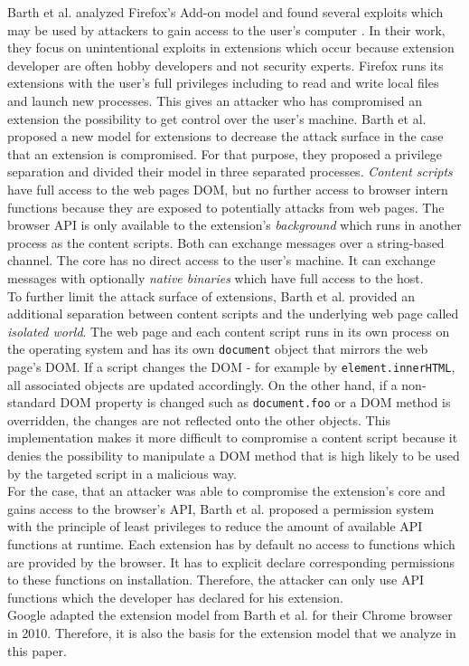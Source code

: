 	Barth et al. analyzed Firefox's Add-on model and found several exploits which may be used by attackers to gain access to the user's computer \cite{Barth10protectingbrowsers}. In their work, they focus on unintentional exploits in extensions which occur because extension developer are often hobby developers and not security experts. Firefox runs its extensions with the user's full privileges including to read and write local files and launch new processes. This gives an attacker who has compromised an extension the possibility to get control over the user's machine. Barth et al. proposed a new model for extensions to decrease the attack surface in the case that an extension is compromised. For that purpose, they proposed a privilege separation and divided their model in three separated processes. \textit{Content scripts} have full access to the web pages DOM, but no further access to browser intern functions because they are exposed to potentially attacks from web pages. The browser API is only available to the extension's \textit{background} which runs in another process as the content scripts. Both can exchange messages over a string-based channel. The core has no direct access to the user's machine. It can exchange messages with optionally \textit{native binaries} which have full access to the host. \\
	To further limit the attack surface of extensions, Barth et al. provided an additional separation between content scripts and the underlying web page called \textit{isolated world}. The web page and each content script runs in its own process on the operating system and has its own \texttt{document} object that mirrors the web page's DOM. If a script changes the DOM - for example by \texttt{element.innerHTML}, all associated objects are updated accordingly. On the other hand, if a non-standard DOM property is changed such as \texttt{document.foo} or a DOM method is overridden, the changes are not reflected onto the other objects. This implementation makes it more difficult to compromise a content script because it denies the possibility to manipulate a DOM method that is high likely to be used by the targeted script in a malicious way. \\
	For the case, that an attacker was able to compromise the extension's core and gains access to the browser's API, Barth et al. proposed a permission system with the principle of least privileges to reduce the amount of available API functions at runtime. Each extension has by default no access to functions which are provided by the browser. It has to explicit declare corresponding permissions to these functions on installation. Therefore, the attacker can only use API functions which the developer has declared for his extension. \\
	Google adapted the extension model from Barth et al. for their Chrome browser in 2010. Therefore, it is also the basis for the extension model that we analyze in this paper.
	
